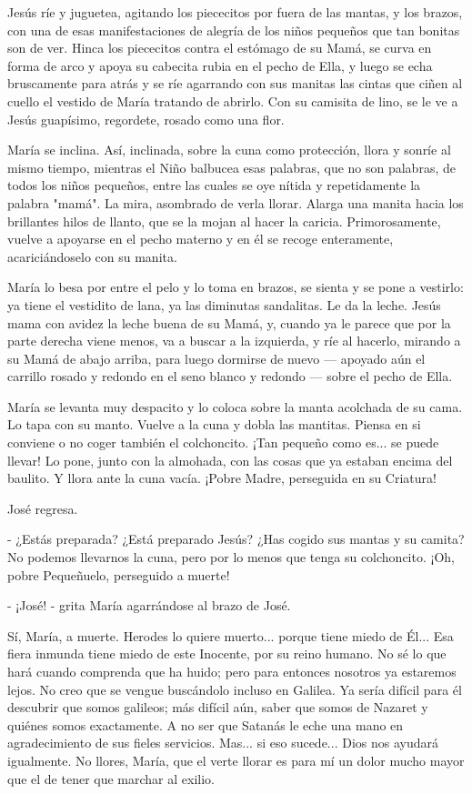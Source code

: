 \documentclass[12pt, twoside, openright]{book} %
\begin{document}
Jesús ríe y juguetea, agitando los piececitos por fuera de las mantas, y los brazos, con una de esas manifestaciones de alegría de los niños pequeños que tan bonitas son de ver. Hinca los piececitos contra el estómago de su Mamá, se curva en forma de arco y apoya su cabecita rubia en el pecho de Ella, y luego se echa bruscamente para atrás y se ríe agarrando con sus manitas las cintas que ciñen al cuello el vestido de María tratando de abrirlo. Con su camisita de lino, se le ve a Jesús guapísimo, regordete, rosado como una flor. 

María se inclina. Así, inclinada, sobre la cuna como protección, llora y sonríe al mismo tiempo, mientras el Niño balbucea esas palabras, que no son palabras, de todos los niños pequeños, entre las cuales se oye nítida y repetidamente la palabra "mamá". La mira, asombrado de verla llorar. Alarga una manita hacia los brillantes hilos de llanto, que se la mojan al hacer la caricia. Primorosamente, vuelve a apoyarse en el pecho materno y en él se recoge enteramente, acariciándoselo con su manita. 

María lo besa por entre el pelo y lo toma en brazos, se sienta y se pone a vestirlo: ya tiene el vestidito de lana, ya las diminutas sandalitas. Le da la leche. Jesús mama con avidez la leche buena de su Mamá, y, cuando ya le parece que por la parte derecha viene menos, va a buscar a la izquierda, y ríe al hacerlo, mirando a su Mamá de abajo arriba, para luego dormirse de nuevo — apoyado aún el carrillo rosado y redondo en el seno blanco y redondo — sobre el pecho de Ella. 

María se levanta muy despacito y lo coloca sobre la manta acolchada de su cama. Lo tapa con su manto. Vuelve a la cuna y dobla las mantitas. Piensa en si conviene o no coger también el colchoncito. ¡Tan pequeño como es... se puede llevar! Lo pone, junto con la almohada, con las cosas que ya estaban encima del baulito. Y llora ante la cuna vacía. ¡Pobre Madre, perseguida en su Criatura! 

José regresa. 

- ¿Estás preparada? ¿Está preparado Jesús? ¿Has cogido sus mantas y su camita? No podemos llevarnos la cuna, pero por lo menos que tenga su colchoncito. ¡Oh, pobre Pequeñuelo, perseguido a muerte! 

- ¡José! - grita María agarrándose al brazo de José. 

Sí, María, a muerte. Herodes lo quiere muerto... porque tiene miedo de Él... Esa fiera inmunda tiene miedo de este Inocente, por su reino humano. No sé lo que hará cuando comprenda que ha huido; pero para entonces nosotros ya estaremos lejos. No creo que se vengue buscándolo incluso en Galilea. Ya sería difícil para él descubrir que somos galileos; más difícil aún, saber que somos de Nazaret y quiénes somos exactamente. A no ser que Satanás le eche una mano en agradecimiento de sus fieles servicios. Mas... si eso sucede... Dios nos ayudará igualmente. No llores, María, que el verte llorar es para mí un dolor mucho mayor que el de tener que marchar al exilio. 
\end{document}
